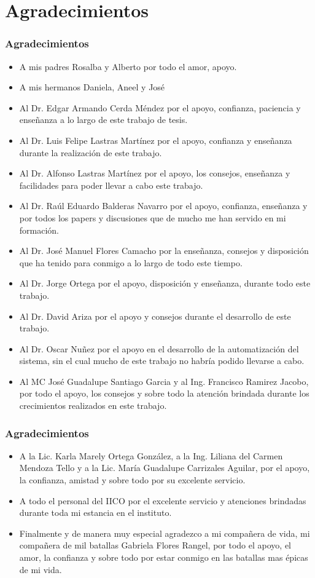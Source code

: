 \section{Agradecimientos}
\begin{frame}[t]
\frametitle{Agradecimientos}
\begin{itemize}
\item<1-> A mis padres Rosalba y Alberto por todo el amor, apoyo. 
\item<1-> A mis hermanos Daniela, Aneel y José
\item<1-> Al Dr. Edgar Armando Cerda Méndez por el apoyo, confianza, paciencia y enseñanza a lo largo de este trabajo de tesis. 
\item<1-> Al Dr. Luis Felipe Lastras Martínez por el apoyo, confianza y enseñanza durante la realización de este trabajo. 
\item<1-> Al Dr. Alfonso Lastras Martínez por el apoyo, los consejos, enseñanza y facilidades para poder llevar a cabo este trabajo. 
\item<1-> Al Dr. Raúl Eduardo Balderas Navarro por el apoyo, confianza, enseñanza y por todos los papers y discusiones que de mucho me han servido en mi formación. 
\item<1-> Al Dr. José Manuel Flores Camacho por la enseñanza, consejos y disposición que ha tenido para conmigo a lo largo de todo este tiempo. 
\item<1-> Al Dr. Jorge Ortega por el apoyo, disposición y enseñanza, durante todo este trabajo. 
\item<1-> Al Dr. David Ariza por el apoyo y consejos durante el desarrollo de este trabajo. 
\item<1-> Al Dr. Oscar Nuñez por el apoyo en el desarrollo de la automatización del sistema, sin el cual mucho de este trabajo no habría podido llevarse a cabo. 
\item<1-> Al  MC José Guadalupe Santiago Garcia y al Ing. Francisco Ramirez Jacobo, por todo el apoyo, los consejos y sobre todo la atención brindada durante los crecimientos realizados en este trabajo. 
\end{itemize}
\end{frame}\begin{frame}[t]
\frametitle{Agradecimientos}
\begin{itemize}
\item A la Lic. Karla Marely Ortega González, a la Ing. Liliana del Carmen Mendoza Tello y a la Lic. Mar\'ia Guadalupe Carrizales Aguilar,  por el apoyo, la confianza, amistad  y sobre todo por su  excelente servicio.  

\item A todo el personal del IICO por el excelente servicio y atenciones brindadas durante toda mi estancia en el instituto.  
\item Finalmente y de manera muy especial agradezco a mi compañera de vida, mi compañera de mil batallas Gabriela Flores Rangel, por todo el apoyo, el amor, la confianza y sobre todo por estar conmigo en las batallas mas épicas de mi vida.
\end{itemize}
\end{frame}
